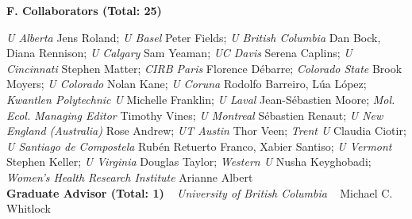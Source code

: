 


\vspace{4pt}	

\noindent \textbf{F. Collaborators (Total: 25)}
\vspace{2pt}	

\noindent \emph{U Alberta} Jens Roland; \emph{U Basel} Peter Fields; \emph{U British Columbia} Dan Bock, Diana Rennison; \emph{U Calgary} Sam Yeaman; \emph{UC Davis} Serena Caplins; \emph{U Cincinnati} Stephen Matter; \emph{CIRB Paris} Florence D\'ebarre; \emph{Colorado State} Brook Moyers; \emph{U Colorado} Nolan Kane; \emph{U Coruna} Rodolfo Barreiro, L\'ua L\'opez; \emph{Kwantlen Polytechnic U} Michelle Franklin; \emph{U Laval} Jean-S\'ebastien Moore; \emph{Mol. Ecol. Managing Editor} Timothy Vines; \emph{U Montreal} S\'ebastien Renaut; \emph{U New England (Australia)} Rose Andrew; \emph{UT Austin} Thor Veen; \emph{Trent U} Claudia Ciotir; \emph{U Santiago de Compostela} Rub\'en Retuerto Franco, Xabier Santiso; \emph{U Vermont} Stephen Keller; \emph{U Virginia} Douglas Taylor; \emph{Western U} Nusha Keyghobadi; \emph{Women's Health Research Institute} Arianne Albert\\



\noindent \textbf{Graduate Advisor (Total: 1)} ~ \emph{University of British Columbia} ~ Michael C. Whitlock






